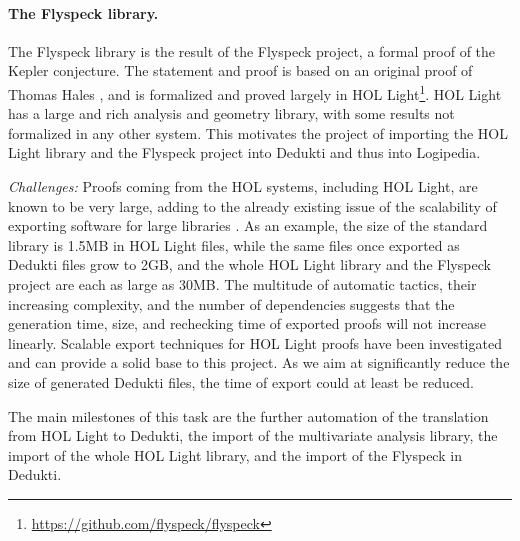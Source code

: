 \paragraph*{The Flyspeck library.}

The Flyspeck library
is the result of the Flyspeck
project, a formal proof of the Kepler conjecture. The statement and
proof is based on an original proof of Thomas Hales
\cite{DBLP:journals/corr/HalesABDHHKMMNNNOPRSTTTUVZ15}, and is
formalized and proved largely in HOL
Light\footnote{\url{https://github.com/flyspeck/flyspeck}}. HOL Light
has a large and rich analysis and geometry library, with some results
not formalized in any other system. This motivates the project of
importing the HOL Light library and the Flyspeck project into
Dedukti and thus into Logipedia.

\emph{Challenges:}
Proofs coming from the HOL systems, including {HOL Light}, are known to
be very large, adding to the already existing issue of the scalability of
exporting software for large libraries
\cite{DBLP:conf/tphol/Wong95,DBLP:conf/cade/ObuaS06,DBLP:conf/itp/KellerW10,
DBLP:conf/cade/Kumar13}. As an example, the size of the standard library is
1.5MB in {HOL Light} files, while the same files once
exported as {Dedukti} files grow to 2GB, and the whole
{HOL Light} library and the {Flyspeck} project are each as
large as 30MB. The multitude of automatic tactics, their increasing
complexity, and the number of dependencies suggests that the generation time, size,
and rechecking time of exported proofs will not increase linearly. Scalable
export techniques for HOL Light proofs have been investigated
\cite{KaliszykK13} and can provide a solid base to
this project. As we aim at significantly reduce the size of generated
Dedukti files, the time of export could at least be reduced.

The main milestones of this task are the further automation of the
translation from HOL Light to Dedukti, the import of the multivariate
analysis library, the import of the whole HOL Light library, and the
import of the Flyspeck in Dedukti.

